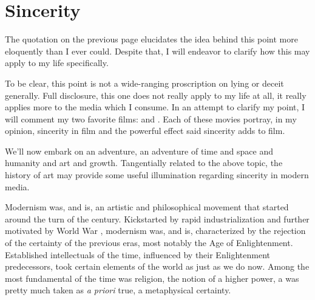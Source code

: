 \documentclass[../butidigress.tex]{subfiles}
\newcounter{worldwarcounter}\setcounter{worldwarcounter}{1}
\begin{document}
\chapter{Sincerity}\label{chap:sincerity}
\newpage

The quotation on the previous page elucidates the idea behind this point more eloquently than I ever could.
Despite that, I will endeavor to clarify how this may apply to my life specifically.

To be clear, this point is not a wide-ranging proscription on lying or deceit generally.
Full disclosure, this one does not really apply to my life at all, it really applies more to the media which I consume.
In an attempt to clarify my point, I will comment my two favorite films:  and .
Each of these movies portray, in my opinion, sincerity in film and the powerful effect said sincerity adds to film.

\vspace{1em}

We'll now embark on an adventure, an adventure of time and space and humanity and art and growth.
Tangentially related to the above topic, the history of art may provide some useful illumination regarding sincerity in modern media.

Modernism was, and is, an artistic and philosophical movement that started around the turn of the  century.
Kickstarted by rapid industrialization and further motivated by World War , modernism was, and is, characterized by the rejection of the certainty of the previous eras, most notably the Age of Enlightenment.
Established intellectuals of the time, influenced by their Enlightenment predecessors, took certain elements of the world as  just as we do now.
Among the most fundamental of the time was religion, the notion of a higher power, a  was pretty much taken as \textit{a priori} true, a metaphysical certainty.
\end{document}
